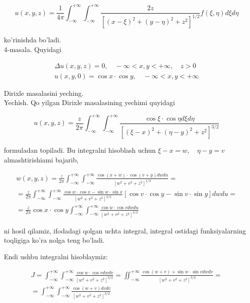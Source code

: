 \documentclass[10pt]{article}
\begin{document}
\begin{equation*}
u(x, y, z)=\frac{1}{4 \pi} \int_{-\infty}^{+\infty} \int_{-\infty}^{+\infty} \frac{2 z}{\left[(x-\xi)^{2}+(y-\eta)^{2}+z^{2}\right]^{1 / 2}} f(\xi, \eta) d \xi d \eta \tag{4.80}
\end{equation*}


ko'rinishda bo'ladi.\\
4-masala. Quyidagi

$$
\begin{gathered}
\Delta u(x, y, z)=0, \quad-\infty<x, y<+\infty, \quad z>0 \\
u(x, y, 0)=\cos x \cdot \cos y, \quad-\infty<x, y<+\infty
\end{gathered}
$$

Dirixle masalasini yeching.\\
Yechish. Qo yilgan Dirixle masalasining yechimi quyidagi

$$
u(x, y, z)=\frac{z}{2 \pi} \int_{-\infty}^{+\infty} \int_{-\infty}^{+\infty} \frac{\cos \xi \cdot \cos \eta d \xi d \eta}{\left[(\xi-x)^{2}+(\eta-y)^{2}+z^{2}\right]^{3 / 2}}
$$

formuladan topiladi. Bu integralni hisoblash uchun $\xi-x=w, \quad \eta-y=v$ almashtirishiami bajarib,


\begin{gather*}
w(x, y, z)=\frac{z}{2 \pi} \int_{-\infty}^{+\infty} \int_{-\infty}^{+\infty} \frac{\cos (x+w) \cdot \cos (v+y) d w d u}{\left[w^{2}+v^{2}+z^{2}\right]^{1 / 2}}= \\
=\frac{z}{2 \pi} \int_{-\infty}^{+\infty} \int_{-\infty}^{+\infty} \frac{\cos w \cdot \cos x-\sin w \cdot \sin x}{\left[w^{2}+v^{2}+z^{2}\right]^{3 / 2}}[\cos v \cdot \cos y-\sin v \cdot \sin y] d w d u= \\
=\frac{z}{2 \pi} \cos x \cdot \cos y \int_{-\infty}^{+\infty} \int_{-\infty}^{+\infty} \frac{\cos w \cdot \cos v d w d u}{\left[w^{2}+v^{2}+z^{2}\right]^{3 / 2}} \tag{4.81}
\end{gather*}


ni hosil qilamiz, ifodadagi qolgan uchta integral, integral ostidagi funksiyalarning toqligiga ko'ra nolga teng bo'ladi.

Endi ushbu integralni hisoblaymiz:

$$
\begin{gathered}
J=\int_{-\infty}^{+\infty} \int_{-\infty}^{+\infty} \frac{\cos w \cdot \cos v d w d v}{\left[w^{2}+v^{2}+z^{2}\right]^{3 / 2}}=\iint_{-\infty}^{+\infty} \frac{\cos (w+v)+\sin w \cdot \sin v d w d v}{\left[w^{2}+v^{2}+z^{2}\right]^{3 / 2}}= \\
=\int_{-\infty}^{+\infty} \int_{-\infty}^{+\infty} \frac{\cos (w+v) d v d v}{\left[w^{2}+v^{2}+z^{2}\right]^{3 / 2}}
\end{gathered}
$$
\end{document}
